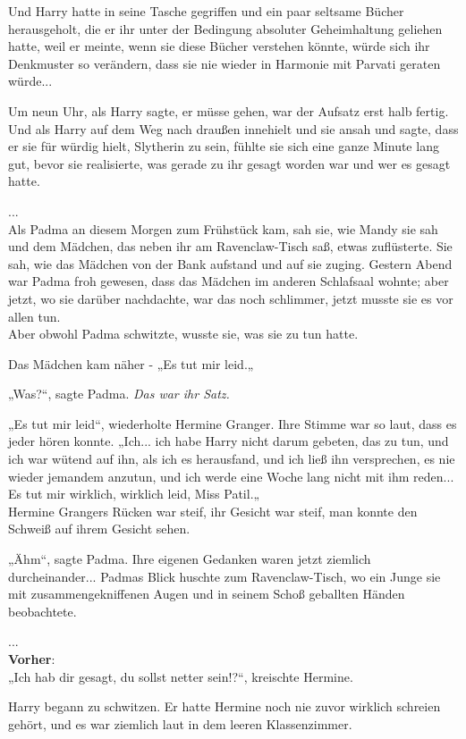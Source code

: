 {Und Harry hatte in seine Tasche gegriffen und ein paar seltsame Bücher herausgeholt, die er ihr unter der Bedingung absoluter Geheimhaltung geliehen hatte, weil er meinte, wenn sie diese Bücher verstehen könnte, würde sich ihr Denkmuster so verändern, dass sie nie wieder in Harmonie mit Parvati geraten würde...

Um neun Uhr, als Harry sagte, er müsse gehen, war der Aufsatz erst halb fertig. Und als Harry auf dem Weg nach draußen innehielt und sie ansah und sagte, dass er sie für würdig hielt, Slytherin zu sein, fühlte sie sich eine ganze Minute lang gut, bevor sie realisierte, was gerade zu ihr gesagt worden war und wer es gesagt hatte.

...\\ Als Padma an diesem Morgen zum Frühstück kam, sah sie, wie Mandy sie sah und dem Mädchen, das neben ihr am Ravenclaw-Tisch saß, etwas zuflüsterte. Sie sah, wie das Mädchen von der Bank aufstand und auf sie zuging. Gestern Abend war Padma froh gewesen, dass das Mädchen im anderen Schlafsaal wohnte; aber jetzt, wo sie darüber nachdachte, war das noch schlimmer, jetzt musste sie es vor allen tun.\\ Aber obwohl Padma schwitzte, wusste sie, was sie zu tun hatte.

Das Mädchen kam näher - „Es tut mir leid.„

„Was?“, sagte Padma. \emph{Das war ihr Satz.}

„Es tut mir leid“, wiederholte Hermine Granger. Ihre Stimme war so laut, dass es jeder hören konnte. „Ich... ich habe Harry nicht darum gebeten, das zu tun, und ich war wütend auf ihn, als ich es herausfand, und ich ließ ihn versprechen, es nie wieder jemandem anzutun, und ich werde eine Woche lang nicht mit ihm reden... Es tut mir wirklich, wirklich leid, Miss Patil.„\\ Hermine Grangers Rücken war steif, ihr Gesicht war steif, man konnte den Schweiß auf ihrem Gesicht sehen.

„Ähm“, sagte Padma. Ihre eigenen Gedanken waren jetzt ziemlich durcheinander... Padmas Blick huschte zum Ravenclaw-Tisch, wo ein Junge sie mit zusammengekniffenen Augen und in seinem Schoß geballten Händen beobachtete.

...\\ \textbf{Vorher}:\\ „Ich hab dir gesagt, du sollst netter sein!?“, kreischte Hermine.

Harry begann zu schwitzen. Er hatte Hermine noch nie zuvor wirklich schreien gehört, und es war ziemlich laut in dem leeren Klassenzimmer.

}
